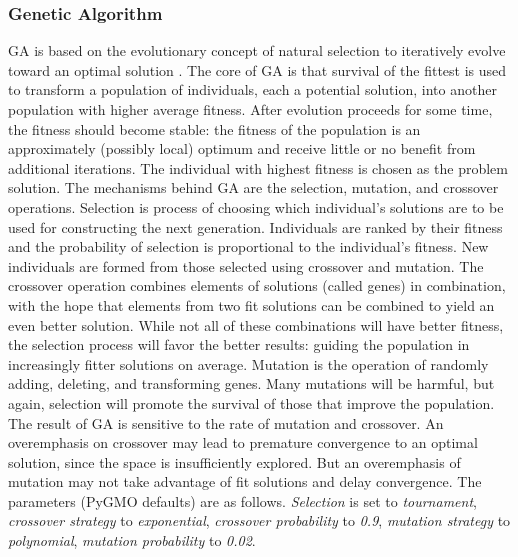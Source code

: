 \documentclass{tamuccthesis}
\begin{document}
\subsubsection{Genetic Algorithm}

GA is based on the evolutionary concept of natural selection to iteratively evolve toward an optimal solution \cite{ga:cao:2016}. The core of GA is that survival of the fittest is used to transform a population of individuals, each a potential solution, into another population with higher average fitness. After evolution proceeds for some time, the fitness should become stable: the fitness of the population is an approximately (possibly local) optimum and receive little or no benefit from additional iterations. The individual with highest fitness is chosen as the problem solution. The mechanisms behind GA are the selection, mutation, and crossover operations. Selection is process of choosing which individual's solutions are to be used for constructing the next generation. Individuals are ranked by their fitness and the probability of selection is proportional to the individual's fitness. New individuals are formed from those selected using crossover and mutation. The crossover operation combines elements of solutions (called genes) in combination, with the hope that elements from two fit solutions can be combined to yield an even better solution. While not all of these combinations will have better fitness, the selection process will favor the better results: guiding the population in increasingly fitter solutions on average. Mutation is the operation of randomly adding, deleting, and transforming genes. Many mutations will be harmful, but again, selection will promote the survival of those that improve the population. The result of GA is sensitive to the rate of mutation and crossover. An overemphasis on crossover may lead to premature convergence to an optimal solution, since the space is insufficiently explored. But an overemphasis of mutation may not take advantage of fit solutions and delay convergence. The parameters (PyGMO defaults) are as follows. \textit{Selection} is set to \textit{tournament}, \textit{crossover strategy} to \textit{exponential}, \textit{crossover probability} to \textit{0.9}, \textit{mutation strategy} to \textit{polynomial}, \textit{mutation probability} to \textit{0.02}. 
\end{document}
